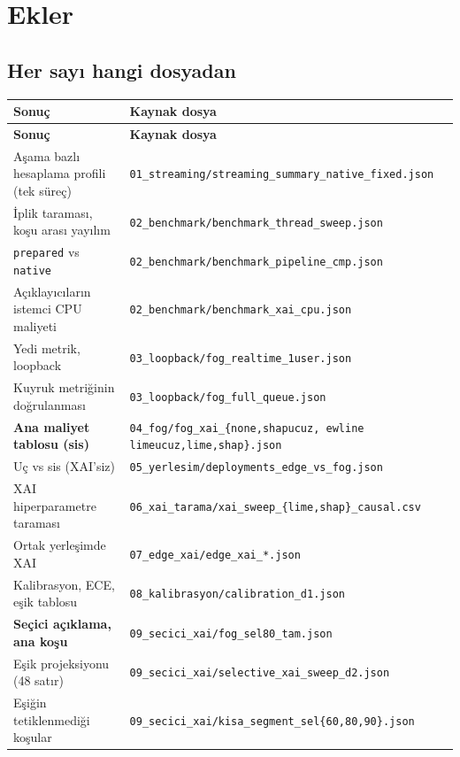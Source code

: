 \documentclass[11pt,a4paper]{report}
\newcommand{\kod}[1]{\texttt{\small #1}}
\newcommand{\dosya}[1]{\texttt{\footnotesize #1}}
\begin{document}
\chapter{Ekler}

\section{Her sayı hangi dosyadan}

{\small
\begin{longtable}{@{}p{6.4cm}p{8.1cm}@{}}
\toprule
\textbf{Sonuç} & \textbf{Kaynak dosya} \\
\midrule
\endfirsthead
\toprule
\textbf{Sonuç} & \textbf{Kaynak dosya} \\
\midrule
\endhead
Aşama bazlı hesaplama profili (tek süreç) & \dosya{01\_streaming/streaming\_summary\_native\_fixed.json} \\
İplik taraması, koşu arası yayılım & \dosya{02\_benchmark/benchmark\_thread\_sweep.json} \\
\kod{prepared} vs \kod{native} & \dosya{02\_benchmark/benchmark\_pipeline\_cmp.json} \\
Açıklayıcıların istemci CPU maliyeti & \dosya{02\_benchmark/benchmark\_xai\_cpu.json} \\
Yedi metrik, loopback & \dosya{03\_loopback/fog\_realtime\_1user.json} \\
Kuyruk metriğinin doğrulanması & \dosya{03\_loopback/fog\_full\_queue.json} \\
\textbf{Ana maliyet tablosu (sis)} & \dosya{04\_fog/fog\_xai\_\{none,shapucuz,
ewline limeucuz,lime,shap\}.json} \\
Uç vs sis (XAI'siz) & \dosya{05\_yerlesim/deployments\_edge\_vs\_fog.json} \\
XAI hiperparametre taraması & \dosya{06\_xai\_tarama/xai\_sweep\_\{lime,shap\}\_causal.csv} \\
Ortak yerleşimde XAI & \dosya{07\_edge\_xai/edge\_xai\_*.json} \\
Kalibrasyon, ECE, eşik tablosu & \dosya{08\_kalibrasyon/calibration\_d1.json} \\
\textbf{Seçici açıklama, ana koşu} & \dosya{09\_secici\_xai/fog\_sel80\_tam.json} \\
Eşik projeksiyonu (48 satır) & \dosya{09\_secici\_xai/selective\_xai\_sweep\_d2.json} \\
Eşiğin tetiklenmediği koşular & \dosya{09\_secici\_xai/kisa\_segment\_sel\{60,80,90\}.json} \\

\end{longtable}}
\end{document}
